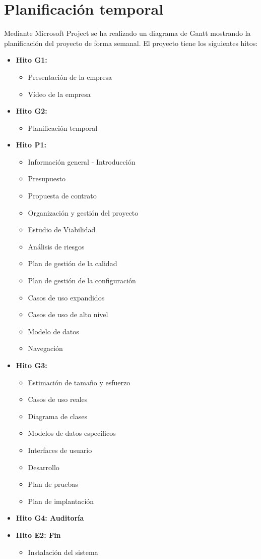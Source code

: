 \section{Planificación temporal}
\par Mediante Microsoft Project se ha realizado un diagrama de Gantt mostrando la planificación del proyecto de forma semanal. El proyecto tiene los siguientes hitos:
\begin{itemize}
	\item \textbf{Hito G1:} 
	\begin{itemize}
		\item Presentación de la empresa
		\item Vídeo de la empresa
	\end{itemize}
	\item \textbf{Hito G2:}
	\begin{itemize}
		\item Planificación temporal
	\end{itemize}
	\item \textbf{Hito P1:}
	\begin{itemize}
		\item Información general - Introducción
		\item Presupuesto
		\item Propuesta de contrato
		\item Organización y gestión del proyecto
		\item Estudio de Viabilidad
		\item Análisis de riesgos
		\item Plan de gestión de la calidad
		\item Plan de gestión de la configuración
		\item Casos de uso expandidos
		\item Casos de uso de alto nivel
		\item Modelo de datos
		\item Navegación
	\end{itemize}
	\item \textbf{Hito G3:}
	\begin{itemize}
		\item Estimación de tamaño y esfuerzo
		\item Casos de uso reales
		\item Diagrama de clases
		\item Modelos de datos específicos
		\item Interfaces de usuario
		\item Desarrollo
		\item Plan de pruebas
		\item Plan de implantación
	\end{itemize}
	\item \textbf{Hito G4: Auditoría}
	\item \textbf{Hito E2: Fin}
	\begin{itemize}
		\item Instalación del sistema
	\end{itemize}
\end{itemize}

